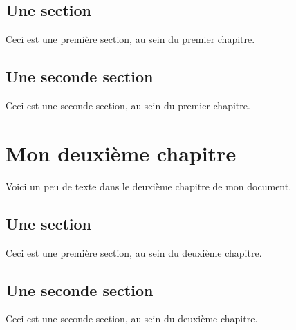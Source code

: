\documentclass[a4paper,11pt]{report}
\begin{document}
    \section{Une section}
    Ceci est une première section, au sein du premier chapitre.
    \section{Une seconde section}
    Ceci est une seconde section, au sein du premier chapitre.

    \chapter{Mon deuxième chapitre}
    Voici un peu de texte dans le deuxième chapitre de mon document.
    \section{Une section}
    Ceci est une première section, au sein du deuxième chapitre.
    \section{Une seconde section}
    Ceci est une seconde section, au sein du deuxième chapitre.



\end{document}

